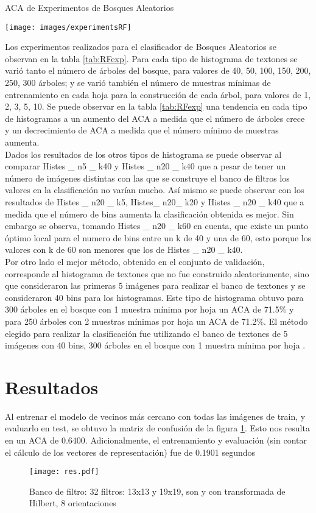 \documentclass[10pt,twocolumn,letterpaper]{article}
\begin{document}
\begin{table}
\caption{ACA de Experimentos de Bosques Aleatorios}
\texttt{[image: images/experimentsRF]}
\label{tab:RFexp}
\end{table}

Los experimentos realizados para el clasificador de Bosques Aleatorios se observan en la tabla \ref{tab:RFexp}. Para cada tipo de histograma de textones se varió tanto el número de árboles del bosque, para valores de 40, 50, 100, 150, 200, 250, 300 árboles; y se varió también el número de muestras mínimas de entrenamiento en cada hoja para la construcción de cada árbol, para valores de 1, 2, 3, 5, 10. Se puede observar en la tabla \ref{tab:RFexp} una tendencia en cada tipo de histogramas a un aumento del ACA a medida que el número de árboles crece y un decrecimiento de ACA a medida que el número mínimo de muestras aumenta. \\
Dados los resultados de los otros tipos de histograma se puede observar al comparar Histes \_ n5 \_ k40 y Histes \_ n20 \_ k40 que a pesar de tener un número de imágenes distintas con las que se construye el banco de filtros los valores en la clasificación no varían mucho. Así mismo se puede observar con los resultados de Histes \_ n20 \_ k5, Histes\_ n20\_ k20 y Histes \_ n20 \_ k40 que a medida que el número de bins aumenta la clasificación obtenida es mejor. Sin embargo se observa, tomando Histes \_ n20 \_ k60 en cuenta, que existe un punto óptimo local para el numero de bins entre un k de 40 y una de 60, esto porque los valores con k de 60 son menores que los de Histes \_ n20 \_ k40.  \\
Por otro lado el mejor método, obtenido en el conjunto de validación, corresponde al histograma de textones que no fue construido aleatoriamente, sino que consideraron las primeras 5 imágenes para realizar el banco de textones y se consideraron 40 bins para los histogramas. Este tipo de histograma obtuvo para 300 árboles en el bosque con 1 muestra mínima por hoja un ACA de 71.5\% y para 250 árboles con 2 muestras mínimas por hoja un ACA de 71.2\%. El método elegido para realizar la clasificación fue utilizando el banco de textones de 5 imágenes con 40 bins, 300 árboles en el bosque con 1 muestra mínima por hoja .


\section{Resultados}
Al entrenar el modelo de vecinos más cercano con todas las imágenes de train, y evaluarlo en test, se obtuvo la matriz de confusión de la figura \ref{fig:resknn}. Esto nos resulta en un ACA de 0.6400. Adicionalmente, el entrenamiento y evaluación (sin contar el cálculo de los vectores de representación) fue de 0.1901 segundos
\begin{figure}[t]
\begin{center}
   \texttt{[image: res.pdf]}
\end{center}
   \caption{Banco de filtro: 32 filtros: 13x13 y 19x19, son y con transformada de Hilbert, 8 orientaciones}
\label{fig:resknn}
\end{figure}
\end{document}
